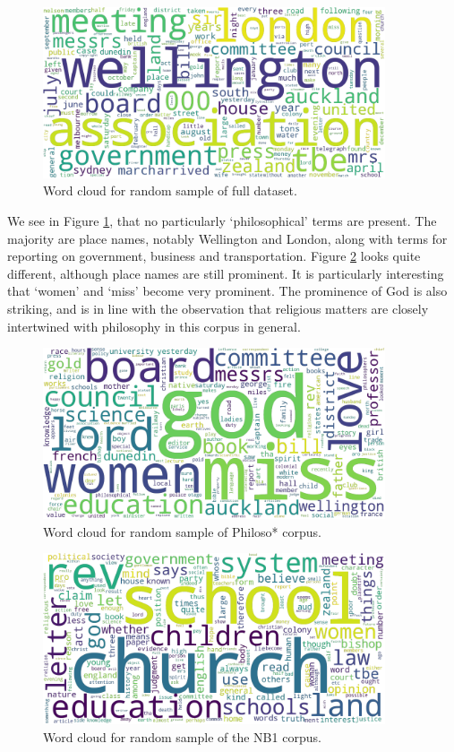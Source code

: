 \documentclass{article}
\begin{document}
\begin{figure}
  \centering
  \includegraphics[width=0.9\textwidth]{images/corpus_10000_subset_tf-idf.png}
  \caption{Word cloud for random sample of full dataset.}
  \label{f:wc-corpus-10k}
\end{figure}

We see in Figure \ref{f:wc-corpus-10k}, that no particularly `philosophical' terms are present. The majority are place names, notably Wellington and London, along with terms for reporting on government, business and transportation. Figure \ref{f:wc-philoso} looks quite different, although place names are still prominent. It is particularly interesting that `women' and `miss' become very prominent. The prominence of God is also striking, and is in line with the observation that religious matters are closely intertwined with philosophy in this corpus in general.

\begin{figure}
  \centering
  \includegraphics[width=0.9\textwidth]{images/philoso_tf-idf.png}
  \caption{Word cloud for random sample of Philoso* corpus.}
  \label{f:wc-philoso}
\end{figure}


\begin{figure}
  \centering
  \includegraphics[width=0.9\textwidth]{images/nb1_philoso_tf-idf.png}
  \caption{Word cloud for random sample of the NB1 corpus.}
  \label{f:wc-nb1}
\end{figure}
\end{document}
